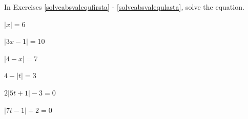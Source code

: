 \documentclass{ximera}
\begin{document}
\begin{question}
In Exercises \ref{solveabsvalequfirsta} - \ref{solveabsvalequlasta}, solve the equation.

\begin{problem}\label{solveabsvalequfirsta}
$|x| = 6$

\begin{selectAll}
\end{selectAll}
\end{problem}

\begin{problem}
$|3x-1| = 10$

\begin{selectAll}
\end{selectAll}
\end{problem}

\begin{problem}
$|4-x| = 7$

\begin{selectAll}
\end{selectAll}
\end{problem}

\begin{problem}
$4 - |t| = 3$

\begin{selectAll}
\end{selectAll}
\end{problem}

\begin{problem}
$2|5t+1| - 3 = 0$

\begin{selectAll}
\end{selectAll}
\end{problem}

\begin{problem}
$|7t-1| + 2 = 0$

\begin{selectAll}
\end{selectAll}
\end{problem}
  

\end{question}
\end{document}
